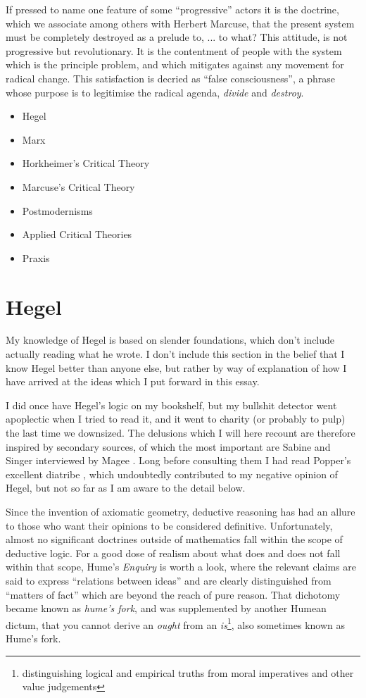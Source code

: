 \documentclass[10pt,titlepage]{article}
\begin{document}
If pressed to name one feature of some ``progressive'' actors it is the doctrine, which we associate among others with Herbert Marcuse, that the present system must be completely destroyed as a prelude to, ... to what?
This attitude, is not progressive but revolutionary.
It is the contentment of people with the system which is the principle problem, and which mitigates against any movement for radical change.
This satisfaction is decried as ``false consciousness'', a phrase whose purpose is to legitimise the radical agenda, \emph{divide} and \emph{destroy}.

\begin{itemize}
\item Hegel
\item Marx
\item Horkheimer's Critical Theory
\item Marcuse's Critical Theory
\item Postmodernisms
\item Applied Critical Theories
\item Praxis
\end{itemize}

\section{Hegel}

My knowledge of Hegel is based on slender foundations, which don't include actually reading what he wrote.
I don't include this section in the belief that I know Hegel better than anyone else, but rather by way of explanation of how I have arrived at the ideas which I put forward in this essay.

I did once have Hegel's logic on my bookshelf, but my bullshit detector went apoplectic when I tried to read it, and it went to charity (or probably to pulp) the last time we downsized.
The delusions which I will here recount are therefore inspired by secondary sources, of which the most important are Sabine \cite{sabine63} and Singer interviewed by Magee \cite{magee-singer}.
Long before consulting them I had read Popper's excellent diatribe \cite{popper-ose}, which undoubtedly contributed to my negative opinion of Hegel, but not so far as I am aware to the detail below.

Since the invention of axiomatic geometry, deductive reasoning has had an allure to those who want their opinions to be considered definitive.
Unfortunately, almost no significant doctrines outside of mathematics fall within the scope of deductive logic.
For a good dose of realism about what does and does not fall within that scope, Hume's \emph{Enquiry} \cite{humeECHU} is worth a look, where the relevant claims are said to express ``relations between ideas'' and are clearly distinguished from ``matters of fact'' which are beyond the reach of pure reason.
That dichotomy became known as \emph{hume's fork}, and was supplemented by another Humean dictum, that you cannot derive an \emph{ought} from an \emph{is}\footnote{distinguishing logical and empirical truths from moral imperatives and other value judgements}, also sometimes known as Hume's fork.
\end{document}
